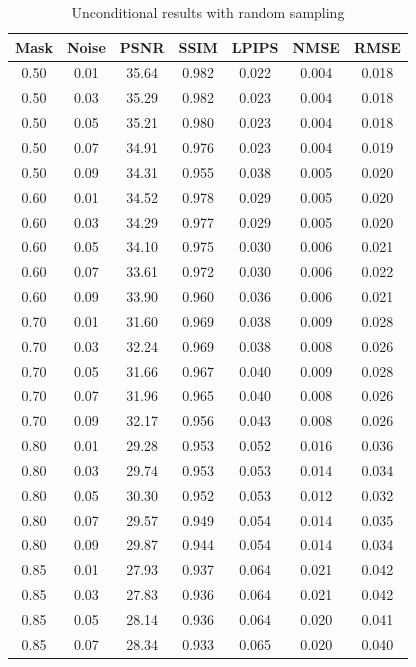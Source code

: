 \begin{table}[htbp]
\centering
\caption{Unconditional results with random sampling}
\label{tab:uncond_random}
\begin{tabular}{ccccccc}
\toprule
Mask & Noise & PSNR & SSIM & LPIPS & NMSE & RMSE \\\midrule
0.50 & 0.01 & 35.64 & 0.982 & 0.022 & 0.004 & 0.018 \\
0.50 & 0.03 & 35.29 & 0.982 & 0.023 & 0.004 & 0.018 \\
0.50 & 0.05 & 35.21 & 0.980 & 0.023 & 0.004 & 0.018 \\
0.50 & 0.07 & 34.91 & 0.976 & 0.023 & 0.004 & 0.019 \\
0.50 & 0.09 & 34.31 & 0.955 & 0.038 & 0.005 & 0.020 \\
0.60 & 0.01 & 34.52 & 0.978 & 0.029 & 0.005 & 0.020 \\
0.60 & 0.03 & 34.29 & 0.977 & 0.029 & 0.005 & 0.020 \\
0.60 & 0.05 & 34.10 & 0.975 & 0.030 & 0.006 & 0.021 \\
0.60 & 0.07 & 33.61 & 0.972 & 0.030 & 0.006 & 0.022 \\
0.60 & 0.09 & 33.90 & 0.960 & 0.036 & 0.006 & 0.021 \\
0.70 & 0.01 & 31.60 & 0.969 & 0.038 & 0.009 & 0.028 \\
0.70 & 0.03 & 32.24 & 0.969 & 0.038 & 0.008 & 0.026 \\
0.70 & 0.05 & 31.66 & 0.967 & 0.040 & 0.009 & 0.028 \\
0.70 & 0.07 & 31.96 & 0.965 & 0.040 & 0.008 & 0.026 \\
0.70 & 0.09 & 32.17 & 0.956 & 0.043 & 0.008 & 0.026 \\
0.80 & 0.01 & 29.28 & 0.953 & 0.052 & 0.016 & 0.036 \\
0.80 & 0.03 & 29.74 & 0.953 & 0.053 & 0.014 & 0.034 \\
0.80 & 0.05 & 30.30 & 0.952 & 0.053 & 0.012 & 0.032 \\
0.80 & 0.07 & 29.57 & 0.949 & 0.054 & 0.014 & 0.035 \\
0.80 & 0.09 & 29.87 & 0.944 & 0.054 & 0.014 & 0.034 \\
0.85 & 0.01 & 27.93 & 0.937 & 0.064 & 0.021 & 0.042 \\
0.85 & 0.03 & 27.83 & 0.936 & 0.064 & 0.021 & 0.042 \\
0.85 & 0.05 & 28.14 & 0.936 & 0.064 & 0.020 & 0.041 \\
0.85 & 0.07 & 28.34 & 0.933 & 0.065 & 0.020 & 0.040 \\

\end{tabular}
\end{table}

